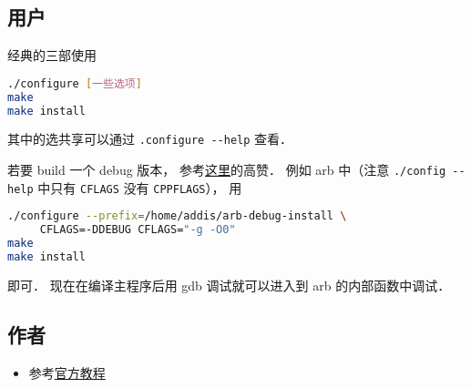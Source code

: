 
\begin{issues}
\issueDraft
\end{issues}


\subsection{用户}
经典的三部使用
\begin{lstlisting}[language=bash]
./configure [一些选项]
make
make install
\end{lstlisting}
其中的选共享可以通过 \verb|.configure --help| 查看．

若要 build 一个 debug 版本， 参考\href{https://stackoverflow.com/questions/4553735/gnu-autotools-debug-release-targets}{这里}的高赞． 例如 arb 中（注意 \verb|./config --help| 中只有 \verb|CFLAGS| 没有 \verb|CPPFLAGS|）， 用
\begin{lstlisting}[language=bash]
./configure --prefix=/home/addis/arb-debug-install \
     CFLAGS=-DDEBUG CFLAGS="-g -O0"
make
make install
\end{lstlisting}
即可． 现在在编译主程序后用 gdb 调试就可以进入到 arb 的内部函数中调试．

\subsection{作者}
\begin{itemize}
\item 参考\href{https://www.gnu.org/software/automake/manual/html_node/Autotools-Introduction.html}{官方教程}

\end{itemize}


